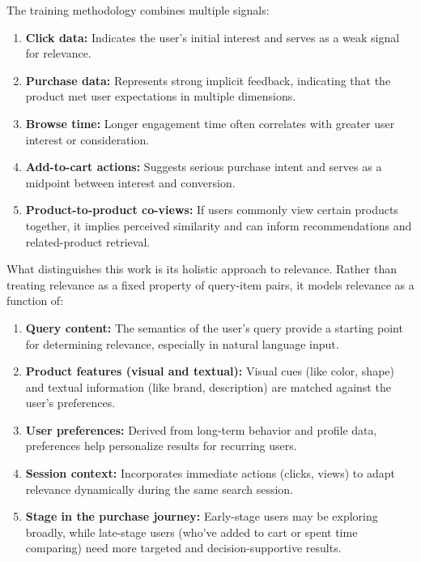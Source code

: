 \documentclass[conference]{IEEEtran}
\begin{document}
\begin{enumerate}
The training methodology combines multiple signals:

\begin{enumerate}
    \item \textbf{Click data:} Indicates the user's initial interest and serves as a weak signal for relevance.
    
    \item \textbf{Purchase data:} Represents strong implicit feedback, indicating that the product met user expectations in multiple dimensions.
    
    \item \textbf{Browse time:} Longer engagement time often correlates with greater user interest or consideration.
    
    \item \textbf{Add-to-cart actions:} Suggests serious purchase intent and serves as a midpoint between interest and conversion.
    
    \item \textbf{Product-to-product co-views:} If users commonly view certain products together, it implies perceived similarity and can inform recommendations and related-product retrieval.
\end{enumerate}

What distinguishes this work is its holistic approach to relevance. Rather than treating relevance as a fixed property of query-item pairs, it models relevance as a function of:

\begin{enumerate}
    \item \textbf{Query content:} The semantics of the user’s query provide a starting point for determining relevance, especially in natural language input.
    
    \item \textbf{Product features (visual and textual):} Visual cues (like color, shape) and textual information (like brand, description) are matched against the user’s preferences.
    
    \item \textbf{User preferences:} Derived from long-term behavior and profile data, preferences help personalize results for recurring users.
    
    \item \textbf{Session context:} Incorporates immediate actions (clicks, views) to adapt relevance dynamically during the same search session.
    
    \item \textbf{Stage in the purchase journey:} Early-stage users may be exploring broadly, while late-stage users (who’ve added to cart or spent time comparing) need more targeted and decision-supportive results.
\end{enumerate}



\end{enumerate}
\end{document}
